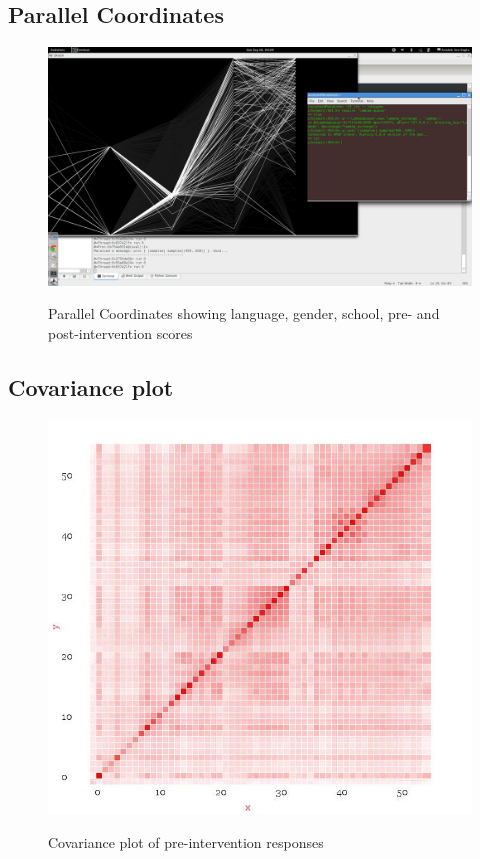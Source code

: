 \documentclass[10pt]{article}
\begin{document}
\subsection{Parallel Coordinates}
\begin{figure}
\caption{Parallel Coordinates showing language, gender, school, pre- and post-intervention scores}
\label{ParallelCoordinates}
\begin{center}
\includegraphics[width=150mm]{ReportMedia/ParallelCoordinates.jpg}\\
\end{center}
\end{figure}
\newpage
\subsection{Covariance plot}
\begin{figure}
\caption{Covariance plot of pre-intervention responses}
\label{CovariancePre}
\begin{center}
\includegraphics[width=120mm]{ReportMedia/CovariancePre.jpg}\\
\end{center}
\end{figure}
\end{document}
